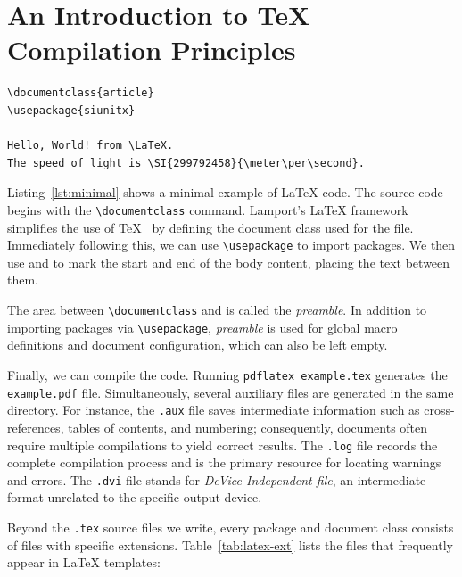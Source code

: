 \section{An Introduction to \TeX{} Compilation Principles}

\begin{lstlisting}[caption={Minimal example of \LaTeX{} code},label={lst:minimal}]
\documentclass{article}
\usepackage{siunitx}

Hello, World! from \LaTeX.
The speed of light is \SI{299792458}{\meter\per\second}.

\end{lstlisting}

Listing~\ref{lst:minimal} shows a minimal example of \LaTeX{} code. The source code begins with the \verb|\documentclass| command. Lamport's \LaTeX{} framework simplifies the use of \TeX{}~\cite{lamport1994document} by defining the document class used for the file. Immediately following this, we can use \verb|\usepackage| to import packages. We then use \verb|| and \verb|| to mark the start and end of the body content, placing the text between them.

The area between \verb|\documentclass| and \verb|| is called the \textit{preamble}. In addition to importing packages via \verb|\usepackage|, \textit{preamble} is used for global macro definitions and document configuration, which can also be left empty.

Finally, we can compile the code. Running \verb|pdflatex example.tex| generates the \verb|example.pdf| file. Simultaneously, several auxiliary files are generated in the same directory. For instance, the \verb|.aux| file saves intermediate information such as cross-references, tables of contents, and numbering; consequently, documents often require multiple compilations to yield correct results. The \verb|.log| file records the complete compilation process and is the primary resource for locating warnings and errors. The \verb|.dvi| file stands for \textit{DeVice Independent file}, an intermediate format unrelated to the specific output device.

Beyond the \verb|.tex| source files we write, every package and document class consists of files with specific extensions. Table~\ref{tab:latex-ext} lists the files that frequently appear in \LaTeX{} templates:

